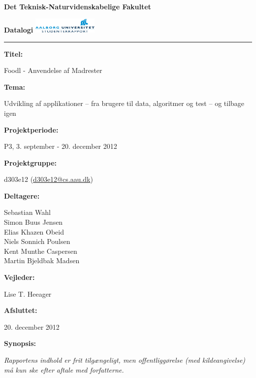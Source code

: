 \begin{nopagebreak}
\LARGE{\textbf{Det Teknisk-Naturvidenskabelige Fakultet}}\vspace{-0.9cm}

\large{\textbf{Datalogi}}
\hspace{10.5cm}\includegraphics[height=0.75cm]{billeder/aau_logo.pdf}


\hrule

\newcommand{\titleitem}[2]{\textbf{#1:}

\hspace*{0.5cm}
\begin{minipage}{0.9\columnwidth}#2\end{minipage}
\vspace{0.25cm}}
\begin{multicols}{2}

\titleitem{Titel}{Foodl - Anvendelse af Madrester}

\titleitem{Tema}{Udvikling af applikationer – fra brugere til data, algoritmer og test – og tilbage igen}

\titleitem{Projektperiode}{P3, 3. september - 20. december 2012}

\titleitem{Projektgruppe}{d303e12 (\url{d303e12@cs.aau.dk})}

\titleitem{Deltagere}{
    Sebastian Wahl\\
    Simon Buus Jensen\\
    Elias Khazen Obeid\\
    Niels Sonnich Poulsen\\
    Kent Munthe Caspersen\\
    Martin Bjeldbak Madsen
}

\titleitem{Vejleder}{Lise T. Heeager}

\titleitem{Afsluttet}{20. december 2012}

\vfill
\columnbreak

\titleitem{Synopsis}{  }

\end{multicols}
\centering
\textit{Rapportens indhold er frit tilgængeligt, men offentliggørelse (med kildeangivelse) må kun ske efter aftale med
forfatterne.}

\end{nopagebreak}
